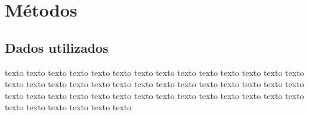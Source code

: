 \chapter{Métodos}
\label{cap:metodos}

\section{Dados utilizados}


texto texto texto texto texto texto texto texto texto texto texto texto texto texto texto texto texto texto texto texto texto texto texto texto texto texto texto texto texto texto texto texto texto texto texto texto texto texto texto texto texto texto texto texto texto texto texto texto